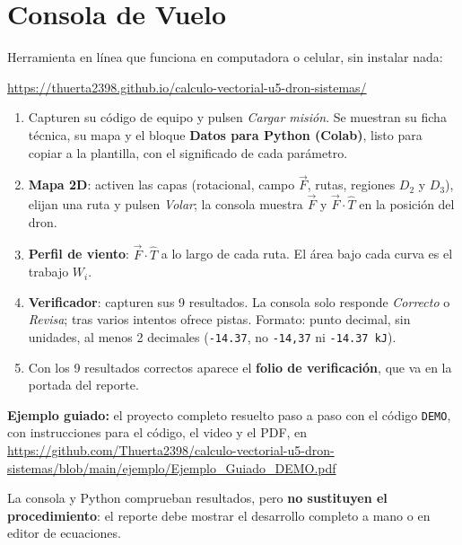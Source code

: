 \documentclass[11pt,letterpaper]{article}
\begin{document}
\section{Consola de Vuelo}
Herramienta en línea que funciona en computadora o celular, sin instalar nada:
\begin{center}\small\url{https://thuerta2398.github.io/calculo-vectorial-u5-dron-sistemas/}\end{center}
\begin{enumerate}
\item Capturen su código de equipo y pulsen \emph{Cargar misión}. Se muestran su ficha técnica, su mapa y el bloque \textbf{Datos para Python (Colab)}, listo para copiar a la plantilla, con el significado de cada parámetro.
\item \textbf{Mapa 2D}: activen las capas (rotacional, campo \(\vec F\), rutas, regiones \(D_2\) y \(D_3\)), elijan una ruta y pulsen \emph{Volar}; la consola muestra \(\vec F\) y \(\vec F\cdot\hat T\) en la posición del dron.
\item \textbf{Perfil de viento}: \(\vec F\cdot\hat T\) a lo largo de cada ruta. El área bajo cada curva es el trabajo \(W_i\).
\item \textbf{Verificador}: capturen sus 9 resultados. La consola solo responde \emph{Correcto} o \emph{Revisa}; tras varios intentos ofrece pistas. Formato: punto decimal, sin unidades, al menos 2 decimales (\texttt{-14.37}, no \texttt{-14,37} ni \texttt{-14.37 kJ}).
\item Con los 9 resultados correctos aparece el \textbf{folio de verificación}, que va en la portada del reporte.
\end{enumerate}
\textbf{Ejemplo guiado:} el proyecto completo resuelto paso a paso con el código \texttt{DEMO}, con instrucciones para el código, el video y el PDF, en \url{https://github.com/Thuerta2398/calculo-vectorial-u5-dron-sistemas/blob/main/ejemplo/Ejemplo_Guiado_DEMO.pdf}

La consola y Python comprueban resultados, pero \textbf{no sustituyen el procedimiento}: el reporte debe mostrar el desarrollo completo a mano o en editor de ecuaciones.
\end{document}
